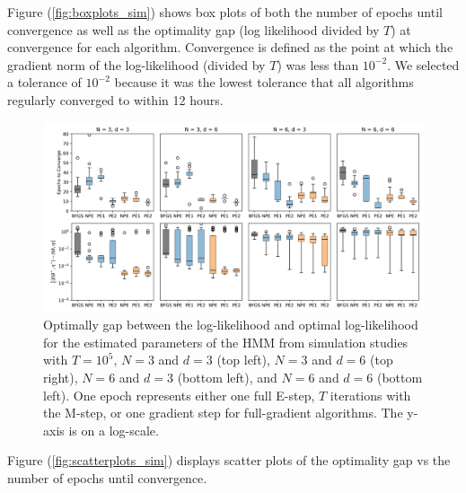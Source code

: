 %
Figure (\ref{fig:boxplots_sim}) shows box plots of both the number of epochs until convergence as well as the optimality gap (log likelihood divided by $T$) at convergence for each algorithm. Convergence is defined as the point at which the gradient norm of the log-likelihood (divided by $T$) was less than $10^{-2}$. We selected a tolerance of $10^{-2}$ because it was the lowest tolerance that all algorithms regularly converged to within 12 hours. 
%
\begin{figure}
    \centering
    \includegraphics[width=6.5in]{../plt/boxplots_sim.png}
    \caption{Optimally gap between the log-likelihood and optimal log-likelihood for the estimated parameters of the HMM from simulation studies with $T=10^{5}$, $N=3$ and $d=3$ (top left), $N=3$ and $d=6$ (top right), $N=6$ and $d=3$ (bottom left), and $N=6$ and $d=6$ (bottom left). One epoch represents either one full E-step, $T$ iterations with the M-step, or one gradient step for full-gradient algorithms. The y-axis is on a log-scale.}
    \label{fig:scatter_sim}
\end{figure}
%
Figure (\ref{fig:scatterplots_sim}) displays scatter plots of the optimality gap vs the number of epochs until convergence.
%
